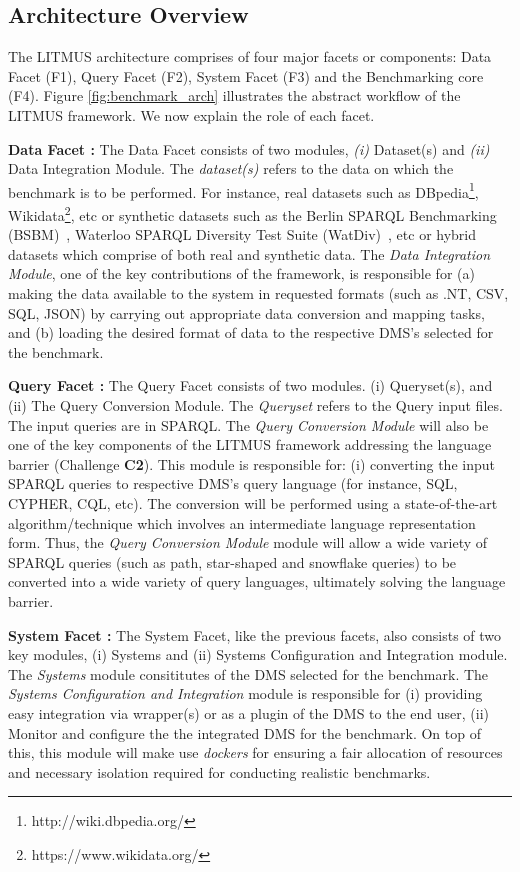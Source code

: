 \documentclass{llncs}
\begin{document}
\begin{itemize}
    \subsection{Architecture Overview}
        The LITMUS architecture comprises of four major facets or components: Data Facet (F1), Query Facet (F2), System Facet (F3) and the Benchmarking core (F4). Figure \ref{fig:benchmark_arch} illustrates the abstract workflow of the LITMUS framework. We now explain the role of each facet. 
        
        \textbf{Data Facet :} The Data Facet consists of two modules, \textit{(i)} Dataset(s) and \textit{(ii)} Data Integration Module. The \textit{dataset(s)} refers to the data on which the benchmark is to be performed. For instance, real datasets such as DBpedia\footnote{http://wiki.dbpedia.org/}, Wikidata\footnote{https://www.wikidata.org/}, etc or synthetic datasets such as the Berlin SPARQL Benchmarking (BSBM)~\cite{bizer2008benchmarking,bizer2009berlin}, Waterloo SPARQL Diversity Test Suite (WatDiv)~\cite{alucc2014diversified}, etc or hybrid datasets which comprise of both real and synthetic data. 
        The \textit{Data Integration Module}, one of the key contributions of the framework, is responsible for (a) making the data available to the system in requested formats (such as .NT, CSV, SQL, JSON) by carrying out appropriate data conversion and mapping tasks, and (b) loading the desired format of data to the respective DMS's selected for the benchmark. 
        
        \textbf{Query Facet :} The Query Facet consists of two modules. (i) Queryset(s), and (ii) The Query Conversion Module. The \textit{Queryset} refers to the Query input files. The input queries are in SPARQL. The \textit{Query Conversion Module} will also be one of the key components of the LITMUS framework addressing the language barrier (Challenge \textbf{C2}). This module is responsible for: (i) converting the input SPARQL queries to respective DMS's query language (for instance, SQL, CYPHER, CQL, etc). The conversion will be performed using a state-of-the-art algorithm/technique which involves an intermediate language representation form. Thus, the \textit{Query Conversion Module} module will allow a wide variety of SPARQL queries (such as path, star-shaped and snowflake queries) to be converted into a wide variety of query languages, ultimately solving the language barrier.
        
        \textbf{System Facet :} The System Facet, like the previous facets, also consists of two key modules, (i) Systems and (ii) Systems Configuration and Integration module. The \textit{Systems} module  consititutes of the DMS selected for the benchmark. The \textit{ Systems Configuration and Integration} module is responsible for (i) providing easy integration via wrapper(s) or as a plugin of the DMS to the end user, (ii) Monitor and configure the the integrated DMS for the benchmark. On top of this, this module will make use \textit{dockers} for ensuring a fair allocation of resources and necessary isolation required for conducting realistic benchmarks. 
        

\end{itemize}
\end{document}
